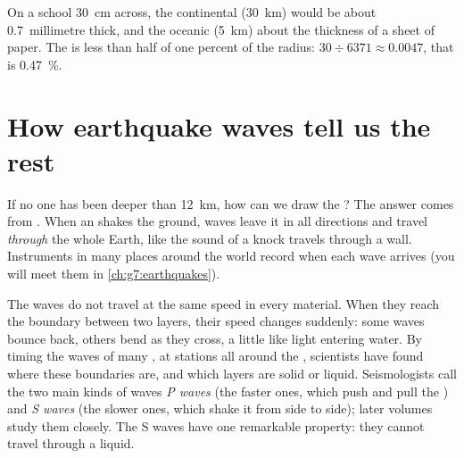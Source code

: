 \begin{remark}\label{rem:g6:inside-the-earth:thin-crust}
On a school  30~cm across, the continental  (30~km) would be
about 0.7~millimetre thick, and the oceanic  (5~km) about the
thickness of a sheet of paper. The  is less than half of one
percent of the radius: $30 \div 6371 \approx 0.0047$, that is 0.47~\%.
\end{remark}

\section{How earthquake waves tell us the rest}\label{sec:g6:inside-the-earth:waves}

If no one has been deeper than 12~km, how can we draw the ? The answer
comes from . When an  shakes the ground, waves leave
it in all directions and travel \emph{through} the whole Earth, like the
sound of a knock travels through a wall. Instruments in many places around the world record when each wave arrives (you will meet them in
\cref{ch:g7:earthquakes}).

The waves do not travel at the same speed in every material. When they
reach the boundary between two layers, their speed changes suddenly: some
waves bounce back, others bend as they cross, a little like light entering
water. By timing the waves of many , at stations all around the , scientists have found where these boundaries are, and
which layers are solid or liquid. Seismologists call the two main kinds of
waves \emph{P waves} (the faster ones, which push and pull the ) and
\emph{S waves} (the slower ones, which shake it from side to side); later
volumes study them closely. The S waves have one remarkable property: they
cannot travel through a liquid.

